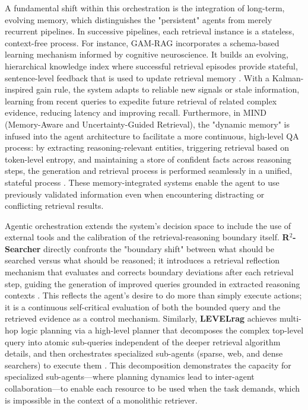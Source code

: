 \documentclass[11pt,a4paper]{article}
\begin{document}
A fundamental shift within this orchestration is the integration of long-term, evolving memory, which distinguishes the "persistent" agents from merely recurrent pipelines. In successive pipelines, each retrieval instance is a stateless, context-free process. For instance, GAM-RAG incorporates a schema-based learning mechanism informed by cognitive neuroscience. It builds an evolving, hierarchical knowledge index where successful retrieval episodes provide stateful, sentence-level feedback that is used to update retrieval memory \cite{arxiv:2603.01783v1}. With a Kalman-inspired gain rule, the system adapts to reliable new signals or stale information, learning from recent queries to expedite future retrieval of related complex evidence, reducing latency and improving recall. Furthermore, in MIND (Memory-Aware and Uncertainty-Guided Retrieval), the "dynamic memory" is infused into the agent architecture to facilitate a more continuous, high-level QA process: by extracting reasoning-relevant entities, triggering retrieval based on token-level entropy, and maintaining a store of confident facts across reasoning steps, the generation and retrieval process is performed seamlessly in a unified, stateful process \cite{arxiv:2503.23095v1}. These memory-integrated systems enable the agent to use previously validated information even when encountering distracting or conflicting retrieval results.

Agentic orchestration extends the system's decision space to include the use of external tools and the calibration of the retrieval-reasoning boundary itself. \textbf{R$^{2}$-Searcher} directly confronts the "boundary shift" between what should be searched versus what should be reasoned; it introduces a retrieval reflection mechanism that evaluates and corrects boundary deviations after each retrieval step, guiding the generation of improved queries grounded in extracted reasoning contexts \cite{arxiv:2606.28566v1}. This reflects the agent's desire to do more than simply execute actions; it is a continuous self-critical evaluation of both the bounded query and the retrieved evidence as a control mechanism. Similarly, \textbf{LEVELrag} achieves multi-hop logic planning via a high-level planner that decomposes the complex top-level query into atomic sub-queries independent of the deeper retrieval algorithm details, and then orchestrates specialized sub-agents (sparse, web, and dense searchers) to execute them \cite{arxiv:2502.18139v1}. This decomposition demonstrates the capacity for specialized sub-agents---where planning dynamics lead to inter-agent collaboration---to enable each resource to be used when the task demands, which is impossible in the context of a monolithic retriever.
\end{document}
